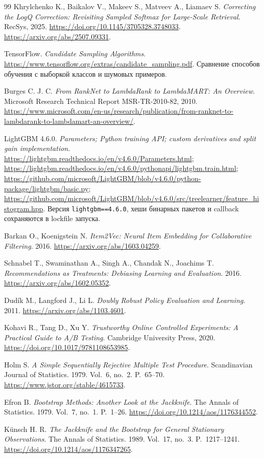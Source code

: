 \documentclass[12pt,a4paper]{article}
\newcommand{\code}[1]{{\ttfamily\small\nolinkurl{#1}}}
\theoremstyle{plainru}
\begin{document}
\begin{thebibliography}{99}
Khrylchenko K., Baikalov V., Makeev S., Matveev A., Liamaev S.
\emph{Correcting the LogQ Correction: Revisiting Sampled Softmax
for Large-Scale Retrieval}.
RecSys, 2025. \url{https://doi.org/10.1145/3705328.3748033}.
\url{https://arxiv.org/abs/2507.09331}.

TensorFlow. \emph{Candidate Sampling Algorithms}.
\url{https://www.tensorflow.org/extras/candidate_sampling.pdf}.
Сравнение способов обучения с выборкой классов и шумовых примеров.

Burges C. J. C.
\emph{From RankNet to LambdaRank to LambdaMART: An Overview}.
Microsoft Research Technical Report MSR-TR-2010-82, 2010.
\url{https://www.microsoft.com/en-us/research/publication/from-ranknet-to-lambdarank-to-lambdamart-an-overview/}.

LightGBM 4.6.0. \emph{Parameters; Python training API;
custom derivatives and split gain implementation}.
\url{https://lightgbm.readthedocs.io/en/v4.6.0/Parameters.html};
\url{https://lightgbm.readthedocs.io/en/v4.6.0/pythonapi/lightgbm.train.html};
\url{https://github.com/microsoft/LightGBM/blob/v4.6.0/python-package/lightgbm/basic.py};
\url{https://github.com/microsoft/LightGBM/blob/v4.6.0/src/treelearner/feature_histogram.hpp}.
Версия \code{lightgbm==4.6.0}, хеши бинарных пакетов и callback
сохраняются в lockfile запуска.

Barkan O., Koenigstein N.
\emph{Item2Vec: Neural Item Embedding for Collaborative Filtering}.
2016. \url{https://arxiv.org/abs/1603.04259}.

Schnabel T., Swaminathan A., Singh A., Chandak N., Joachims T.
\emph{Recommendations as Treatments: Debiasing Learning and Evaluation}.
2016. \url{https://arxiv.org/abs/1602.05352}.

Dud\'ik M., Langford J., Li L.
\emph{Doubly Robust Policy Evaluation and Learning}.
2011. \url{https://arxiv.org/abs/1103.4601}.

Kohavi R., Tang D., Xu Y.
\emph{Trustworthy Online Controlled Experiments:
A Practical Guide to A/B Testing}.
Cambridge University Press, 2020.
\url{https://doi.org/10.1017/9781108653985}.

Holm S. \emph{A Simple Sequentially Rejective Multiple Test Procedure}.
Scandinavian Journal of Statistics. 1979. Vol.~6, no.~2. P.~65--70.
\url{https://www.jstor.org/stable/4615733}.

Efron B.
\emph{Bootstrap Methods: Another Look at the Jackknife}.
The Annals of Statistics. 1979. Vol.~7, no.~1. P.~1--26.
\url{https://doi.org/10.1214/aos/1176344552}.

Künsch H. R.
\emph{The Jackknife and the Bootstrap for General Stationary Observations}.
The Annals of Statistics. 1989. Vol.~17, no.~3. P.~1217--1241.
\url{https://doi.org/10.1214/aos/1176347265}.

\end{thebibliography}
\endgroup
\end{document}
